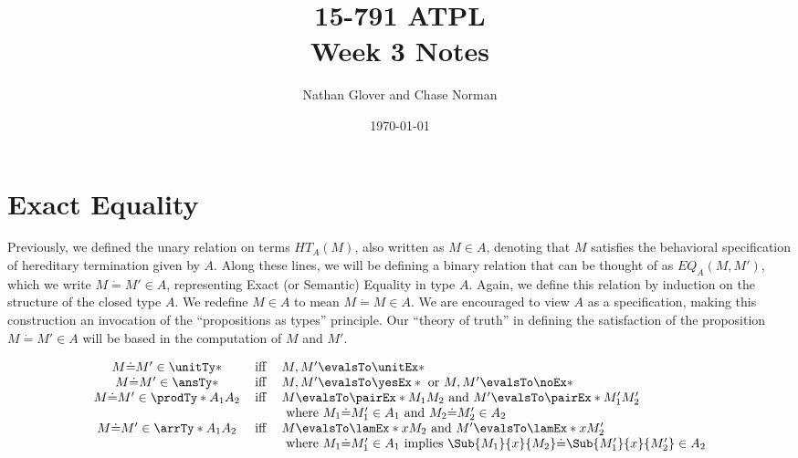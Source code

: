 \documentclass[letterpaper]{article}
\title{15-791 ATPL \\ Week 3 Notes}
\author{Nathan Glover and Chase Norman}
\date{\today}
\begin{document}
\maketitle

\section{Exact Equality}

Previously, we defined the unary relation on terms $HT_A(M)$, also written as $M \in A$, denoting that $M$ satisfies the behavioral specification of hereditary termination given by $A$.
Along these lines, we will be defining a binary relation that can be thought of as $EQ_A(M, M')$, which we write $M \dot{=} M' \in A$, representing Exact (or Semantic) Equality in type $A$.
Again, we define this relation by induction on the structure of the closed type $A$. We redefine $M \in A$ to mean $M \dot{=} M \in A$. 
We are encouraged to view $A$ as a specification, making this construction an invocation of the ``propositions as types'' principle. 
Our ``theory of truth'' in defining the satisfaction of the proposition $M \dot{=} M' \in A$ will be based in the computation of $M$ and $M'$. 

\begin{definition}
    $$
  \begin{array}{cll}
      M \dot{=} M' \in \unitTy* & \Iff & M, M' \evalsTo \unitEx* \\
      M \dot{=} M' \in \ansTy* & \Iff & M, M' \evalsTo \yesEx* \text{ or } M, M' \evalsTo \noEx* \\
      M \dot{=} M' \in \prodTy*{A_1}{A_2} & \Iff &
         M \evalsTo \pairEx*{M_1}{M_2} \text{ and } M' \evalsTo \pairEx*{M_1'}{M_2'}\\ & & \text{ where } M_1 \dot{=} M_1' \in A_1 \text{ and } M_2 \dot{=} M_2' \in A_2 \\
      M \dot{=} M' \in \arrTy*{A_1}{A_2} & \Iff & M \evalsTo \lamEx*{x}{M_2} \text{ and } M' \evalsTo \lamEx*{x}{M_2'}\\ & & 
         \text{ where } M_1 \dot{=} M_1' \in A_1 \text{ implies } \Sub{M_1}{x}{M_2} \dot{=} \Sub{M_1'}{x}{M_2'} \in A_2 \\
  \end{array}
  $$
  \end{definition}
\end{document}
